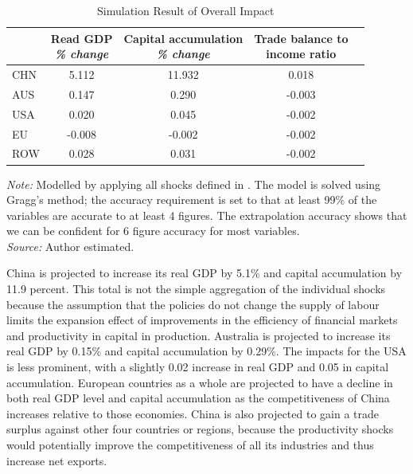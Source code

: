 \documentclass[AER]{AEA}
\begin{document}
\begin{table}[!htb]
\begin{threeparttable}
\caption{Simulation Result of Overall Impact}
\label{tab:sim-all}
\def\theadset{\def\arraytretch{1.5}}
\def\arraystretch{1.2}
\small
\begin{tabular}{lcccc}
\hline\hline
    & \thead{Read GDP\\\emph{\% change}} 
    & \thead{Capital accumulation\\\emph{\% change}} 
    & \thead{Trade balance to\\income ratio} \\
\hline
CHN & 5.112 &	11.932 & 0.018 \\
AUS & 0.147 &	0.290  & -0.003 \\
USA & 0.020 &	0.045  & -0.002 \\
EU  & -0.008 &	-0.002 & -0.002 \\
ROW & 0.028 &	0.031  & -0.002 \\
\hline\hline
\end{tabular}
\begin{tablenotes}
\emph{Note:} 
Modelled by applying all shocks defined in .
The model is solved using Gragg's method; the accuracy requirement is set 
to that at least 99\% of the variables are accurate to at least 4 figures. 
The extrapolation accuracy shows that we can be confident for 6 figure accuracy 
for most variables.\\
\emph{Source:} Author estimated.
\end{tablenotes}
\end{threeparttable}
\end{table}

China is projected to 
increase its real GDP by 5.1\% and capital accumulation by 11.9
percent.
This total is not the simple aggregation of the individual shocks 
because the assumption that the policies do not change the supply of 
labour limits the expansion effect of improvements in the efficiency 
of financial markets and productivity in capital in production.
Australia is projected to increase its real GDP by 0.15\% 
and capital accumulation by 0.29\%. The impacts for the USA is less 
prominent, with a slightly 0.02 increase in real GDP and 0.05 in capital 
accumulation. European countries as a whole are projected to have a 
decline in both real GDP level and capital accumulation as the competitiveness 
of China increases relative to those economies. China is also 
projected to gain a trade surplus against other four countries or regions, 
because the productivity shocks would potentially improve the competitiveness 
of all its industries and thus increase net exports.  
\end{document}
